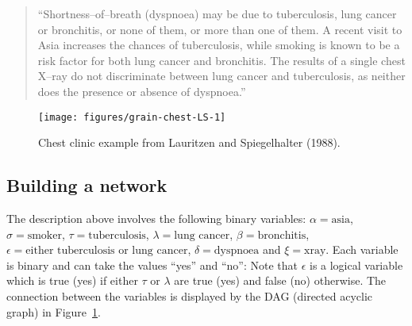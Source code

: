 \documentclass[10pt]{article}\usepackage[]{graphicx}\usepackage[]{xcolor}
\makeatletter
\def\maxwidth{ %
  \ifdim\Gin@nat@width>\linewidth
    \linewidth
  \else
    \Gin@nat@width
  \fi
}
\newenvironment{knitrout}{}{} %
\makeatother
\begin{document}
\begin{quote}
  ``Shortness--of--breath (dyspnoea) may be due to tuberculosis, lung
  cancer or bronchitis, or none of them, or more than one of them. A
  recent visit to Asia increases the chances of tuberculosis, while
  smoking is known to be a risk factor for both lung cancer and
  bronchitis. The results of a single chest X--ray do not discriminate
  between lung cancer and tuberculosis, as neither does the presence or
  absence of dyspnoea.''
\end{quote}


\begin{knitrout}
\color{fgcolor}\begin{figure}
\texttt{[image: figures/grain-chest-LS-1]} \caption[Chest clinic example from Lauritzen and Spiegelhalter (1988)]{Chest clinic example from Lauritzen and Spiegelhalter (1988).}\label{fig:chest-LS}
\end{figure}

\end{knitrout}

\subsection{Building a network}

The description above involves the following binary variables:
$\alpha=\mbox{asia}$,
$\sigma=\mbox{smoker}$,
$\tau=\mbox{tuberculosis}$,
$\lambda=\mbox{lung cancer}$,
$\beta=\mbox{bronchitis}$,
$\epsilon=\mbox{either tuberculosis or lung cancer}$,
$\delta=\mbox{dyspnoea}$ and
$\xi=\mbox{xray}$. 
Each variable is binary and can take the values ``yes'' and ``no'':
Note that $\epsilon$ is a logical variable which is
true (yes) if either $\tau$ or $\lambda$ are true (yes) and false (no) otherwise.
The connection between the variables is displayed by the DAG (directed acyclic graph) in
Figure~\ref{fig:chest-LS}.
\end{document}
